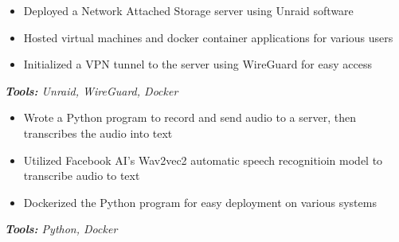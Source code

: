 \documentclass[10pt,letter]{altacv}
\begin{document}
\divider


\begin{itemize}
  \item Deployed a Network Attached Storage server using Unraid software
  \item Hosted virtual machines and docker container applications for various users  
  \item Initialized a VPN tunnel to the server using WireGuard for easy access
\end{itemize}
\textit{\textbf{Tools:} Unraid, WireGuard, Docker}

\divider


\begin{itemize}
  \item Wrote a Python program to record and send audio to a server, then transcribes the audio into text
  \item Utilized Facebook AI's Wav2vec2 automatic speech recognitioin model to transcribe audio to text
  \item Dockerized the Python program for easy deployment on various systems
\end{itemize}
\textit{\textbf{Tools:} Python, Docker}
\end{document}

